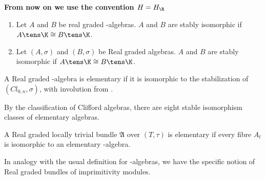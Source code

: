 \textbf{From now on we use the convention $H=H_\R$}
\begin{definition}
\begin{enumerate}
\item
	Let $A$ and $B$ be real graded \Cstar-algebras. $A$ and $B$ are stably isomorphic if $A\tens \K\cong B\tens \K$. 
\item
	Let $(A,\sigma)$ and $(B,\sigma)$ be Real graded algebras. $A$ and $B$ are stably isomorphic if $A\tens \K\cong B\tens \K$. 
	\end{enumerate}
\end{definition}
\begin{definition}
	A Real graded \Cstar-algebra is elementary if it is isomorphic to the stabilization of $(Cl_{0,n},\sigma)$, with involution from . 
\end{definition}
\begin{remark}
	By the classification of Clifford algebras, there are eight stable isomorphism classes of elementary algebras.  
\end{remark}
\begin{definition}
	A Real graded locally trivial \Cstar bundle $\mathfrak{A}$ over $(T,\tau)$ is elementary if every fibre $A_t$ is isomorphic to an elementary \Cstar-algebra. 
\end{definition}
\noindent In analogy with the usual definition for \Cstar-algebras, we have the specific notion of Real graded bundles of imprimitivity modules. 
